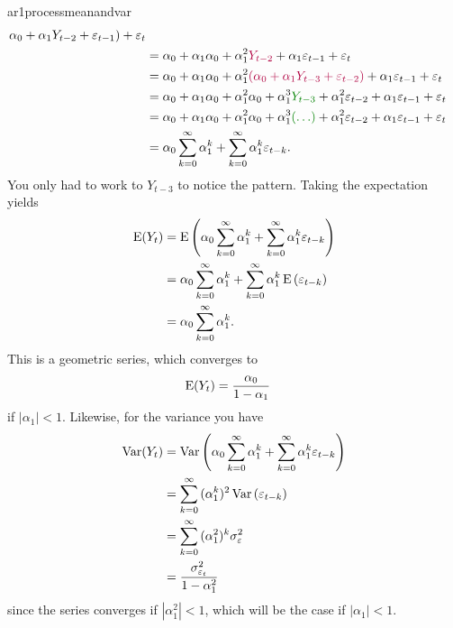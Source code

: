 \begin{answer}{ar1processmeanandvar}
\begin{align*}
{  \alpha_0 + \alpha_1 Y_{t-2} + \varepsilon_{t-1}
  )}
                       + \varepsilon_{t} \\
      &=
  \alpha_0 + \alpha_1
  \alpha_0 + \alpha_1^2 \textcolor{dwred}{Y_{t-2}} + \alpha_1\varepsilon_{t-1}
                       + \varepsilon_{t} \\
      &=
  \alpha_0 + \alpha_1
  \alpha_0 + \alpha_1^2
  \textcolor{dwred}{(
  \alpha_0 + \alpha_1 Y_{t-3} + \varepsilon_{t-2}
  )
  }
                         + \alpha_1\varepsilon_{t-1}
                        + \varepsilon_{t} \\
      &=
  \alpha_0 + \alpha_1
  \alpha_0 + \alpha_1^2
  \alpha_0 + \alpha_1^3 \textcolor{dwgreen}{Y_{t-3}} + \alpha_1^2\varepsilon_{t-2}
                        + \alpha_1\varepsilon_{t-1}
                        + \varepsilon_{t} \\
      &=
  \alpha_0 + \alpha_1
  \alpha_0 + \alpha_1^2
  \alpha_0 + \alpha_1^3
  \textcolor{dwgreen}{(\ldots)} + \alpha_1^2\varepsilon_{t-2}
                        + \alpha_1\varepsilon_{t-1}
                        + \varepsilon_{t} \\
      &=
  \alpha_0
  \sum_{k=0}^{\infty}
  {\alpha_1^k}
  +
  \sum_{k=0}^{\infty}{
    \alpha_1^k
    \varepsilon_{t-k}
    }
    \text{.}
\end{align*}
You only had to work to
$Y_{t-3}$
to notice the pattern.
Taking the expectation yields
\begin{align*}
\operatorname{\mathrm{E}}(Y_t)
&=
\operatorname{\mathrm{E}}\left(
  \alpha_0
  \sum_{k=0}^{\infty}
  {\alpha_1^k}
  +
  \sum_{k=0}^{\infty}{
    \alpha_1^k
    \varepsilon_{t-k}
    }
    \right) \\
&=
  \alpha_0
  \sum_{k=0}^{\infty}
  {\alpha_1^k}
  +
  \sum_{k=0}^{\infty}{
    \alpha_1^k
\operatorname{\mathrm{E}}\left(
    \varepsilon_{t-k}
    \right)
    } \\
&=
  \alpha_0
  \sum_{k=0}^{\infty}
  {\alpha_1^k}
  \text{.}
\end{align*}
This is a geometric series, which converges to
\begin{align*}
\operatorname{\mathrm{E}}(Y_t)
&=
  \frac{\alpha_0}{1-\alpha_1}
\end{align*}
if
$|\alpha_1| < 1$.
Likewise, for the variance you have
\begin{align*}
\operatorname{\mathrm{Var}}(Y_t)
&=
\operatorname{\mathrm{Var}}\left(
  \alpha_0
  \sum_{k=0}^{\infty}
  {\alpha_1^k}
  +
  \sum_{k=0}^{\infty}{
    \alpha_1^k
    \varepsilon_{t-k}
    }
    \right) \\
&=
  \sum_{k=0}^{\infty}{
    (\alpha_1^k)^2
\operatorname{\mathrm{Var}}\left(
    \varepsilon_{t-k}
    \right)
    } \\
&=
  \sum_{k=0}^{\infty}{
    (\alpha_1^2)^k
    \sigma^2_{\varepsilon}
    } \\
&= \frac{ \sigma^2_{\varepsilon_{t}}}{1- \alpha_1^2}
\end{align*}
since the series converges if
$|\alpha_1^2| < 1$,
which will be the case if
$|\alpha_1| < 1$.


\end{answer}
